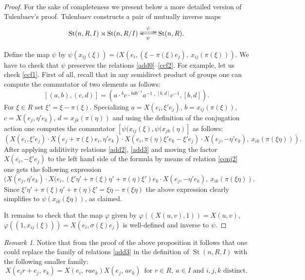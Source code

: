 \documentclass[11pt]{amsart}
\theoremstyle{plain} \declaretheorem[name=Theorem, Refname={Theorem,Theorems}]{tm} \Crefname{tm}{Theorem}{Theorems}
\numberwithin{equation}{section}
\theoremstyle{definition} \newtheorem{df}[lm]{Definition} \Crefname{df}{Definition}{Definitions}
\theoremstyle{remark} \newtheorem{rk}[lm]{Remark} \Crefname{rk}{Remark}{Remarks}
\newcommand{\St}{\mathop{\mathrm{St}}\nolimits}
\begin{document}
\begin{proof} For the sake of completeness we present below a more detailed version of Tulenbaev's proof.
Tulenbaev constructs a pair of mutually inverse maps
$$\xymatrix{ \St(n, R, I) \rtimes \St(n, R/I) \ar@<0.6ex>[r]^-\varphi &  \ar[l]^-\psi \St(n, R).}$$

Define the map $\psi$ by $\psi(x_{ij}(\xi)) = (X(e_i, (\xi - \pi(\xi)e_j),\ x_{ij}(\pi(\xi)))$. 
We have to check that $\psi$ preserves the relations \eqref{add0}--\eqref{ccf2}.
For example, let us check \eqref{ccf1}. 
First of all, recall that in any semidirect product of groups one can compute the commutator of two elements as follows:
$$[(a, b), (c, d)] = (a \cdot {}^bc \cdot {}^{bdb^{-1}}a^{-1} \cdot {}^{[b, d]}c^{-1} , [b, d]).$$
For $\xi\in R$ set $\xi' = \xi - \pi(\xi)$.
Specializing $a = X(e_i, \xi' e_j)$, $b = x_{ij}(\pi(\xi))$, $c = X(e_j, \eta'e_k)$, $d = x_{jk}(\pi(\eta))$ and using the definition of the conjugation action 
one computes the commutator $[\psi(x_{ij}(\xi), \psi(x_{jk}(\eta)]$ as follows:
$$\left(X(e_i, \xi' e_j) \cdot X(e_j + \pi(\xi)e_i, \eta'e_k) \cdot X(e_i, \pi(\eta)\xi' e_k - \xi' e_j) \cdot X(e_j, -\eta'e_k),\ x_{ik}(\pi(\xi\eta))\right).$$
After applying additivity relations \eqref{add2}, \eqref{add3} and moving the factor $X(e_i, -\xi' e_j)$ to the left hand side of the formula by means of relation \eqref{conj2}
one gets the following expression
$$(X(e_j, \eta'e_k) \cdot X(e_i, (\xi' \eta' + \pi(\xi)\eta' + \pi(\eta)\xi')e_k \cdot X(e_j, -\eta'e_k),\ x_{ik}(\pi(\xi\eta)).$$
Since $\xi'\eta' + \pi(\xi)\eta' + \pi(\eta)\xi' = \xi\eta - \pi(\xi\eta)$ the above expression clearly simplifies to $\psi(x_{ik}(\xi\eta))$, as claimed.

It remains to check that the map $\varphi$ given by $\varphi\left((X(u, v), 1)\right) = X(u, v),$ $\varphi\left((1, x_{ij}(\xi))\right) = X(e_i, \sigma(\xi)e_j)$
is well-defined and inverse to $\psi$.
\end{proof}

\begin{rk} \label{rk:T123'} Notice that from the proof of the above proposition it follows that one could replace the family of relations \eqref{add3}
in the definition of $\St(n, R, I)$ with the following smaller family:
\setcounter{equation}{2} \renewcommand{\theequation}{T\arabic{equation}'}
\begin{equation} X(e_ir+e_j,\,e_k)=X(e_i,\,rae_k)X(e_j,\,ae_k)\,\text{ for }r\in R,\ a\in I\text{ and } i,j,k\text{ distinct}. \label{add3'} \end{equation} \end{rk}
\end{document}
